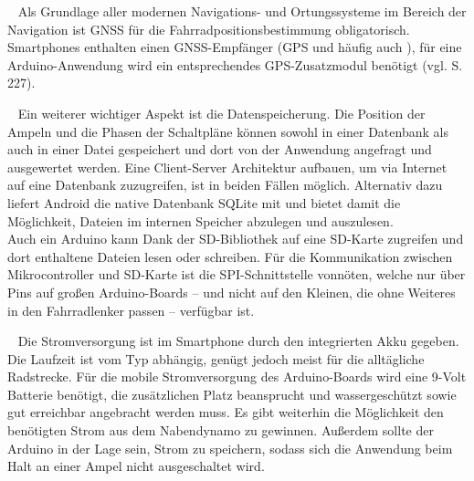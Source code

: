 \begin{description}[leftmargin=0.7cm,style=nextline]
  \item[\gls{GNSS}] ~ Als Grundlage aller modernen Navigations- und Ortungssysteme im Bereich der Navigation ist \gls{GNSS} für die Fahrradpositionsbestimmung obligatorisch. \glspl{Smartphone} enthalten einen \gls{GNSS}-Empfänger (\gls{GPS} und häufig auch ), für eine \gls{Arduino}-Anwendung wird ein entsprechendes \gls{GPS}-Zusatzmodul benötigt (vgl. \cite{arduino} S. 227).\\
 \item[Datenspeicherung] ~ Ein weiterer wichtiger Aspekt ist die Datenspeicherung. Die Position der Ampeln und die Phasen der Schaltpläne können sowohl in einer Datenbank als auch in einer Datei gespeichert und dort von der Anwendung angefragt und ausgewertet werden. Eine Client-Server Architektur aufbauen, um via Internet auf eine Datenbank zuzugreifen, ist in beiden Fällen möglich. Alternativ dazu liefert Android die native Datenbank SQLite mit und bietet damit die Möglichkeit, Dateien im internen Speicher abzulegen und auszulesen.\\ 
Auch ein \gls{Arduino} kann Dank der SD-Bibliothek auf eine SD-Karte zugreifen und dort enthaltene Dateien lesen oder schreiben. Für die Kommunikation zwischen Mikrocontroller und SD-Karte ist die SPI-Schnittstelle vonnöten, welche nur über Pins auf großen \gls{Arduino}-Boards -- und nicht auf den Kleinen, die ohne Weiteres in den Fahrradlenker passen -- verfügbar ist.\cite{arduino_sd}\\
  \item[Stromversorgung] ~ Die Stromversorgung ist im \gls{Smartphone} durch den integrierten Akku gegeben. Die Laufzeit ist vom Typ abhängig, genügt jedoch meist für die alltägliche Radstrecke. Für die mobile Stromversorgung des \gls{Arduino}-Boards wird eine 9-Volt Batterie benötigt, die zusätzlichen Platz beansprucht und wassergeschützt sowie gut erreichbar angebracht werden muss. Es gibt weiterhin die Möglichkeit den benötigten Strom aus dem Nabendynamo zu gewinnen. Außerdem sollte der \gls{Arduino} in der Lage sein, Strom zu speichern, sodass sich die Anwendung beim Halt an einer Ampel nicht ausgeschaltet wird.\\

\end{description}
